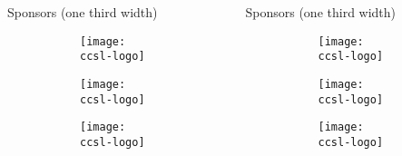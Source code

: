 \documentclass[
  xcolor={hyperref,svgnames,x11names,table},
  hyperref={pdfencoding=unicode,plainpages=false,pdfpagelabels=true,breaklinks=true},
  brazilian,english,
]{beamer}
\newcommand\onethirdcol{\column{.2922\textwidth}}
\begin{document}
\begin{frame}[fragile]
\begin{columns}[T]
    \begin{block}{Sponsors (one third width)}
    \vspace{.5\baselineskip}
    \centering
    \begin{figure}[H] %
      \begin{subfigure}[c]{.3\textwidth}
        \centering
        \texttt{[image: ccsl-logo]}
      \end{subfigure}
      \begin{subfigure}[c]{.3\textwidth}
        \centering
        \texttt{[image: ccsl-logo]}
      \end{subfigure}
      \begin{subfigure}[c]{.3\textwidth}
        \centering
        \texttt{[image: ccsl-logo]}
      \end{subfigure}
    \end{figure}
  \end{block}

  \onethirdcol

  \begin{block}{Sponsors (one third width)}
    \vspace{.5\baselineskip}
    \centering
    \begin{figure}[H] %
      \begin{subfigure}[c]{.3\textwidth}
        \centering
        \texttt{[image: ccsl-logo]}
      \end{subfigure}
      \begin{subfigure}[c]{.3\textwidth}
        \centering
        \texttt{[image: ccsl-logo]}
      \end{subfigure}
      \begin{subfigure}[c]{.3\textwidth}
        \centering
        \texttt{[image: ccsl-logo]}
      \end{subfigure}
    \end{figure}
  \end{block}


\end{columns}
\end{frame}
\end{document}
